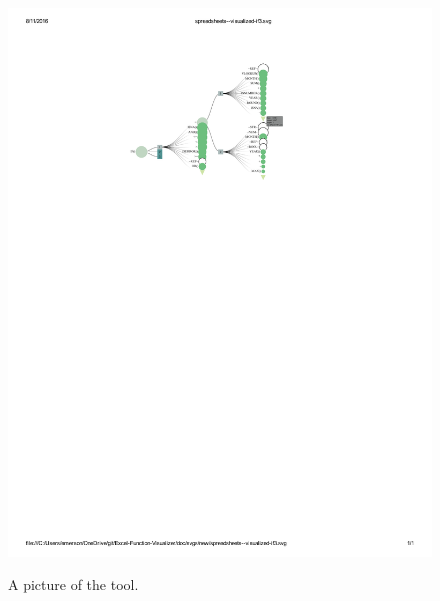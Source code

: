 \documentclass[conference]{IEEEtran}
\begin{document}
	\begin{figure}[t] \includegraphics[width = \textwidth]{IFargslabel} \caption{A
			picture of the tool.} \centering \label{fig:fullpic} \end{figure}
	
\end{document}
